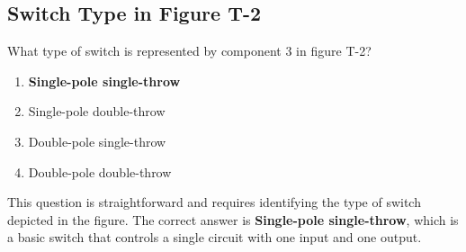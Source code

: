 \subsection{Switch Type in Figure T-2}
\label{T6A12(A)}

\begin{tcolorbox}[colback=gray!10!white,colframe=black!75!black,title=T6A12(A)]
What type of switch is represented by component 3 in figure T-2?
\begin{enumerate}[noitemsep]
    \item \textbf{Single-pole single-throw}
    \item Single-pole double-throw
    \item Double-pole single-throw
    \item Double-pole double-throw
\end{enumerate}
\end{tcolorbox}

This question is straightforward and requires identifying the type of switch depicted in the figure. The correct answer is \textbf{Single-pole single-throw}, which is a basic switch that controls a single circuit with one input and one output.

